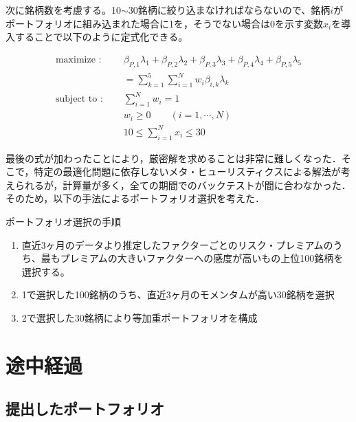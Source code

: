 \documentclass[11pt]{jreport}
\begin{document}
次に銘柄数を考慮する。10$\sim$30銘柄に絞り込まなければならないので、銘柄$i$がポートフォリオに組み込まれた場合に1を，そうでない場合は0を示す変数$x_i$を導入することで以下のように定式化できる。

\begin{equation}
\begin{split}
\text{maximize : }\quad & \beta_{P,1}\lambda_1 + \beta_{P,2}\lambda_2 + \beta_{P,3}\lambda_3 + \beta_{P,4}\lambda_4 + \beta_{P,5}\lambda_5\\
& = \sum_{k=1}^5 \sum_{i=1}^N w_i \beta_{i,k} \lambda_k\\
\text{subject to : }\quad & \sum_{i=1}^N w_i = 1\\
& w_i \geq 0\qquad(i=1,\cdots,N)\\
&10 \leq \sum_{i=1}^Nx_i \leq 30
\end{split}
\label{eq:port_optim}
\end{equation}

最後の式が加わったことにより，厳密解を求めることは非常に難しくなった．そこで，特定の最適化問題に依存しないメタ・ヒューリスティクスによる解法が考えられるが，計算量が多く，全ての期間でのバックテストが間に合わなかった．そのため，以下の手法によるポートフォリオ選択を考えた．

\begin{itembox}[l]{ポートフォリオ選択の手順}
\begin{enumerate}
\item 直近3ヶ月のデータより推定したファクターごとのリスク・プレミアムのうち、最もプレミアムの大きいファクターへの感度が高いもの上位100銘柄を選択する。
\item 1で選択した100銘柄のうち、直近3ヶ月のモメンタムが高い30銘柄を選択
\item 2で選択した30銘柄により等加重ポートフォリオを構成
\end{enumerate}
\end{itembox}

\chapter{途中経過}
\section{提出したポートフォリオ}
\end{document}
